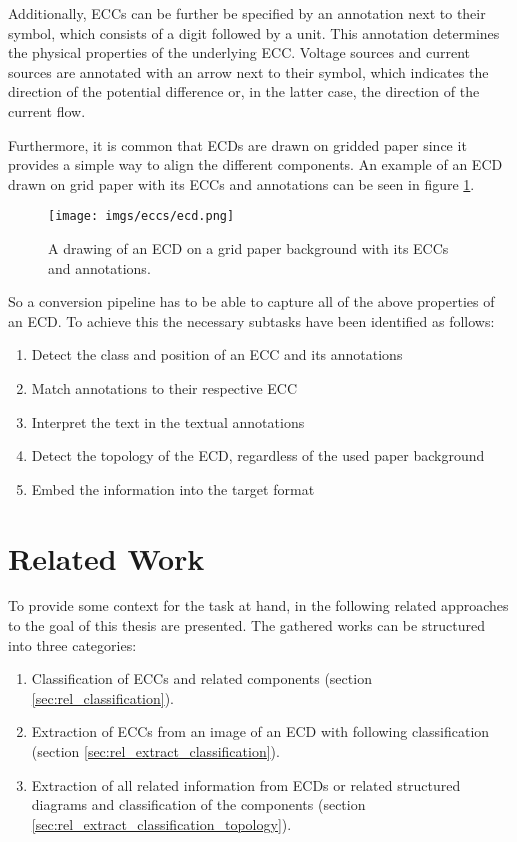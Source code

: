 Additionally, \acp{ECC} can be further be specified by an annotation next to their symbol, which consists of a digit followed by a unit.
This annotation determines the physical properties of the underlying \ac{ECC}.
Voltage sources and current sources are annotated with an arrow next to their symbol, which indicates the direction of the potential difference or, in the latter case, the direction of the current flow.

Furthermore, it is common that \acp{ECD} are drawn on gridded paper since it provides a simple way to align the different components. An example of an \ac{ECD} drawn on grid paper with its \acp{ECC} and annotations can be seen in figure \ref{fig:example_ecd}.

\begin{figure}
\begin{center}
    \texttt{[image: imgs/eccs/ecd.png]}
    \caption{A drawing of an \ac{ECD} on a grid paper background with its \acp{ECC} and annotations.}
    \label{fig:example_ecd}
\end{center}
\end{figure}

\newpage
So a conversion pipeline has to be able to capture all of the above properties of an \ac{ECD}.
To achieve this the necessary subtasks have been identified as follows:
\begin{enumerate}
    \item Detect the class and position of an \ac{ECC} and its annotations
    \item Match annotations to their respective \ac{ECC}
    \item Interpret the text in the textual annotations
    \item Detect the topology of the \ac{ECD}, regardless of the used paper background
    \item Embed the information into the target format
\end{enumerate}

\section{Related Work}

To provide some context for the task at hand, in the following related approaches to the goal of this thesis are presented.
The gathered works can be structured into three categories:
\begin{enumerate}
    \item Classification of \acp{ECC} and related components (section \ref{sec:rel_classification}).
    \item Extraction of \acp{ECC} from an image of an \ac{ECD} with following classification (section \ref{sec:rel_extract_classification}).
    \item Extraction of all related information from \acp{ECD} or related structured diagrams and classification of the components (section \ref{sec:rel_extract_classification_topology}).
\end{enumerate}

